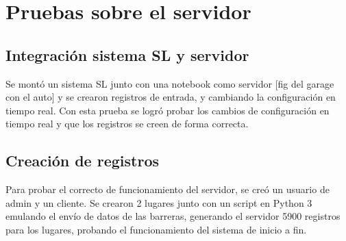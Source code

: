 \section{Pruebas sobre el servidor}

\subsection{Integración sistema SL y servidor}

Se montó un sistema SL junto con una notebook como servidor [fig del garage con el auto] y se crearon registros de entrada, y cambiando la configuración en tiempo real. Con esta prueba se logró probar los cambios de configuración en tiempo real y que los registros se creen de forma correcta.

\subsection{Creación de registros}

Para probar el correcto de funcionamiento del servidor, se creó un usuario de admin y un cliente. Se crearon 2 lugares junto con un script en Python 3 emulando el envío de datos de las barreras, generando el servidor 5900 registros para los lugares, probando el funcionamiento del sistema de inicio a fin.




